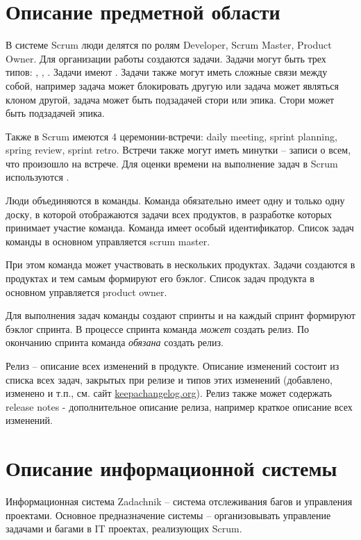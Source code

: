 \section{Описание предметной области}
В системе Scrum люди делятся по ролям
Developer, Scrum Master, Product Owner.
Для организации работы создаются задачи.
Задачи могут быть трех типов: , ,
.
Задачи имеют .
Задачи также могут иметь сложные связи между собой, например
задача может блокировать другую или задача может являться клоном другой,
задача может быть подзадачей стори или эпика.
Стори может быть подзадачей эпика.

Также в Scrum имеются 4 церемонии-встречи: daily meeting, sprint
planning, spring review, sprint retro.
Встречи также могут иметь минутки -- записи о всем, что произошло на встрече.
Для оценки времени на выполнение задач в Scrum используются .

Люди объединяются в команды. Команда обязательно имеет одну и только одну доску,
в которой отображаются задачи всех продуктов, в разработке
которых принимает участие команда.
Команда имеет особый идентификатор.
Список задач команды в основном управляется scrum master.

При этом команда может участвовать в нескольких продуктах.
Задачи создаются в продуктах и тем самым формируют его бэклог.
Список задач продукта в основном управляется product owner.

Для выполнения задач команды создают спринты и на каждый
спринт формируют бэклог спринта.
В процессе спринта команда \emph{может} создать релиз.
По окончанию спринта команда \emph{обязана} создать релиз.

Релиз -- описание всех изменений в продукте.
Описание изменений состоит из списка всех задач,
закрытых при релизе и типов этих изменений (добавлено, изменено и т.п., см. сайт \url{keepachangelog.org}).
Релиз также может содержать release notes - дополнительное описание релиза, например
краткое описание всех изменений.

\section{Описание информационной системы}
Информационная система Zadachnik -- система отслеживания багов и
управления проектами.
Основное предназначение системы -- организовывать управление задачами и багами
в IT проектах, реализующих Scrum.

